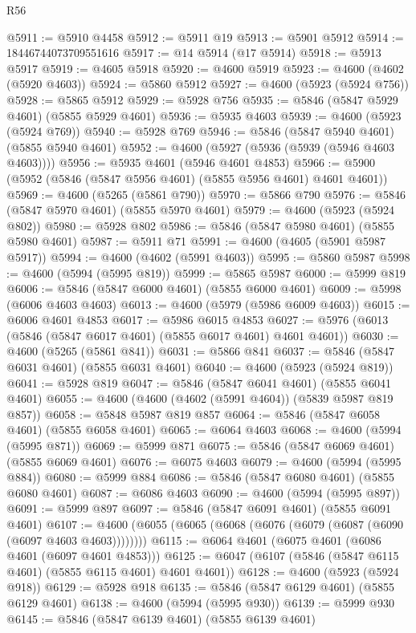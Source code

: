 \begin{lexlean}{R56}
\begin{coremodule}
@5911 := @5910 @4458
@5912 := @5911 @19
@5913 := @5901 @5912
@5914 := 18446744073709551616
@5917 := @14 @5914 (@17 @5914)
@5918 := @5913 @5917
@5919 := @4605 @5918
@5920 := @4600 @5919
@5923 := @4600 (@4602 (@5920 @4603))
@5924 := @5860 @5912
@5927 := @4600 (@5923 (@5924 @756))
@5928 := @5865 @5912
@5929 := @5928 @756
@5935 := @5846 (@5847 @5929 @4601) (@5855 @5929 @4601)
@5936 := @5935 @4603
@5939 := @4600 (@5923 (@5924 @769))
@5940 := @5928 @769
@5946 := @5846 (@5847 @5940 @4601) (@5855 @5940 @4601)
@5952 := @4600 (@5927 (@5936 (@5939 (@5946 @4603 @4603))))
@5956 := @5935 @4601 (@5946 @4601 @4853)
@5966 := @5900 (@5952 (@5846 (@5847 @5956 @4601) (@5855 @5956 @4601) @4601 @4601))
@5969 := @4600 (@5265 (@5861 @790))
@5970 := @5866 @790
@5976 := @5846 (@5847 @5970 @4601) (@5855 @5970 @4601)
@5979 := @4600 (@5923 (@5924 @802))
@5980 := @5928 @802
@5986 := @5846 (@5847 @5980 @4601) (@5855 @5980 @4601)
@5987 := @5911 @71
@5991 := @4600 (@4605 (@5901 @5987 @5917))
@5994 := @4600 (@4602 (@5991 @4603))
@5995 := @5860 @5987
@5998 := @4600 (@5994 (@5995 @819))
@5999 := @5865 @5987
@6000 := @5999 @819
@6006 := @5846 (@5847 @6000 @4601) (@5855 @6000 @4601)
@6009 := @5998 (@6006 @4603 @4603)
@6013 := @4600 (@5979 (@5986 @6009 @4603))
@6015 := @6006 @4601 @4853
@6017 := @5986 @6015 @4853
@6027 := @5976 (@6013 (@5846 (@5847 @6017 @4601) (@5855 @6017 @4601) @4601 @4601))
@6030 := @4600 (@5265 (@5861 @841))
@6031 := @5866 @841
@6037 := @5846 (@5847 @6031 @4601) (@5855 @6031 @4601)
@6040 := @4600 (@5923 (@5924 @819))
@6041 := @5928 @819
@6047 := @5846 (@5847 @6041 @4601) (@5855 @6041 @4601)
@6055 := @4600 (@4600 (@4602 (@5991 @4604)) (@5839 @5987 @819 @857))
@6058 := @5848 @5987 @819 @857
@6064 := @5846 (@5847 @6058 @4601) (@5855 @6058 @4601)
@6065 := @6064 @4603
@6068 := @4600 (@5994 (@5995 @871))
@6069 := @5999 @871
@6075 := @5846 (@5847 @6069 @4601) (@5855 @6069 @4601)
@6076 := @6075 @4603
@6079 := @4600 (@5994 (@5995 @884))
@6080 := @5999 @884
@6086 := @5846 (@5847 @6080 @4601) (@5855 @6080 @4601)
@6087 := @6086 @4603
@6090 := @4600 (@5994 (@5995 @897))
@6091 := @5999 @897
@6097 := @5846 (@5847 @6091 @4601) (@5855 @6091 @4601)
@6107 := @4600 (@6055 (@6065 (@6068 (@6076 (@6079 (@6087 (@6090 (@6097 @4603 @4603))))))))
@6115 := @6064 @4601 (@6075 @4601 (@6086 @4601 (@6097 @4601 @4853)))
@6125 := @6047 (@6107 (@5846 (@5847 @6115 @4601) (@5855 @6115 @4601) @4601 @4601))
@6128 := @4600 (@5923 (@5924 @918))
@6129 := @5928 @918
@6135 := @5846 (@5847 @6129 @4601) (@5855 @6129 @4601)
@6138 := @4600 (@5994 (@5995 @930))
@6139 := @5999 @930
@6145 := @5846 (@5847 @6139 @4601) (@5855 @6139 @4601)

\end{coremodule}
\end{lexlean}
